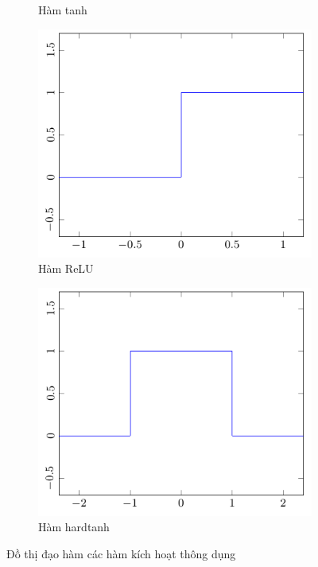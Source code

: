 \begin{figure}[htbp]
\begin{subfigure}[b]{0.33\textwidth}
        \caption{Hàm tanh}
    \end{subfigure}\hfil%
    \begin{subfigure}[b]{0.33\textwidth}
        \centering
        \includegraphics[width=\textwidth]{tikz_image/diff_relu.pdf}
        \caption{Hàm ReLU}
    \end{subfigure}\hfil%
    \begin{subfigure}[b]{0.33\textwidth}
        \centering
        \includegraphics[width=\textwidth]{tikz_image/diff_hardtanh.pdf}
        \caption{Hàm hardtanh}
    \end{subfigure}%
    \caption{Đồ thị đạo hàm các hàm kích hoạt thông dụng}
    \label{figure:differential-activation-funtion}
\end{figure}


